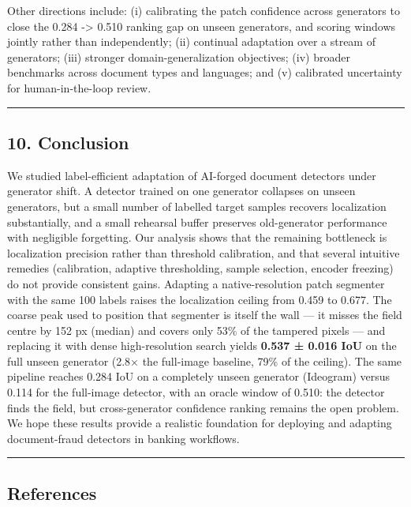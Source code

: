 Other directions include: (i) calibrating the patch confidence across generators to close the 0.284 -\textgreater{} 0.510 ranking gap on unseen generators, and scoring windows jointly rather than independently; (ii) continual adaptation over a stream of generators; (iii) stronger domain-generalization objectives; (iv) broader benchmarks across document types and languages; and (v) calibrated uncertainty for human-in-the-loop review.

\begin{center}\rule{0.5\linewidth}{0.5pt}\end{center}

\subsection{10. Conclusion}\label{conclusion}

We studied label-efficient adaptation of AI-forged document detectors under generator shift. A detector trained on one generator collapses on unseen generators, but a small number of labelled target samples recovers localization substantially, and a small rehearsal buffer preserves old-generator performance with negligible forgetting. Our analysis shows that the remaining bottleneck is localization precision rather than threshold calibration, and that several intuitive remedies (calibration, adaptive thresholding, sample selection, encoder freezing) do not provide consistent gains. Adapting a native-resolution patch segmenter with the same 100 labels raises the localization ceiling from 0.459 to 0.677. The coarse peak used to position that segmenter is itself the wall --- it misses the field centre by 152 px (median) and covers only 53\% of the tampered pixels --- and replacing it with dense high-resolution search yields \textbf{0.537 ± 0.016 IoU} on the full unseen generator (2.8× the full-image baseline, 79\% of the ceiling). The same pipeline reaches 0.284 IoU on a completely unseen generator (Ideogram) versus 0.114 for the full-image detector, with an oracle window of 0.510: the detector finds the field, but cross-generator confidence ranking remains the open problem. We hope these results provide a realistic foundation for deploying and adapting document-fraud detectors in banking workflows.

\begin{center}\rule{0.5\linewidth}{0.5pt}\end{center}

\subsection{References}\label{references}

